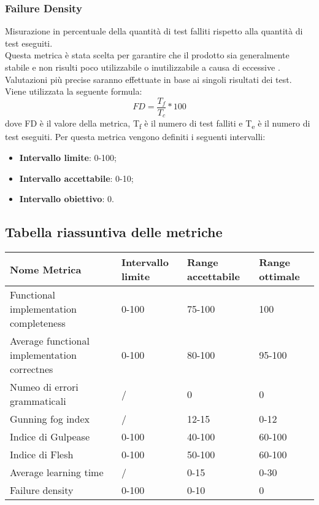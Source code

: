 \subsubsection{Failure Density}
Misurazione in percentuale della quantità di test falliti rispetto alla quantità di test eseguiti.
\\Questa metrica è stata scelta per garantire che il prodotto sia generalmente stabile e non risulti poco utilizzabile o inutilizzabile a causa di eccessive . Valutazioni più precise saranno effettuate in base ai singoli risultati dei test.\\
Viene utilizzata la seguente formula:
$$FD=\frac{T_f}{T_c}*100$$
dove FD è il valore della metrica, T\textsubscript{f} è il numero di test falliti e T\textsubscript{e} è il numero di test eseguiti.
Per questa metrica vengono definiti i seguenti intervalli: 
\begin{itemize}
	\item{\textbf{Intervallo limite}: 0-100;}
	\item{\textbf{Intervallo accettabile}: 0-10;}
	\item{\textbf{Intervallo obiettivo}: 0.}
\end{itemize}
\subsection{Tabella riassuntiva delle metriche}
\begin{table}[H]
	\centering
	\begin{tabular}{|p{4cm}|C{3cm}|C{3cm}|C{3cm}|}
		\hline
		Nome Metrica & Intervallo limite & Range accettabile & Range ottimale \\ \hline
		Functional implementation completeness & 0-100 & 75-100 & 100 \\ \hline
		Average functional implementation correctnes&0-100&80-100&95-100 \\ \hline
		Numeo di errori grammaticali & / & 0 & 0 \\ \hline
		Gunning fog index & / &12-15&0-12 \\ \hline
		Indice di Gulpease & 0-100& 40-100& 60-100 \\ \hline
		Indice di Flesh& 0-100 & 50-100& 60-100\\ \hline
		Average learning time& / &0-15 & 0-30 \\ \hline
		Failure density&0-100&0-10&0\\ \hline
	\end{tabular}
\end{table}
\pagebreak
